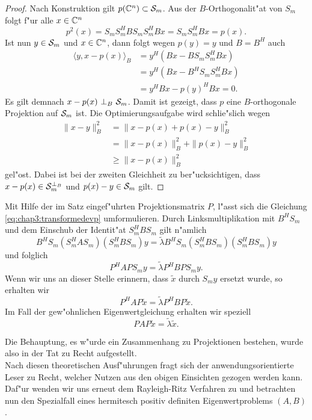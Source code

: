 \begin{proof}
Nach Konstruktion gilt $p(\Cn)\subset \S_m$. Aus der $B$-Orthogonalit"at von $S_m$ folgt f"ur alle $x\in\Cn$
\[
p^2 (x) = S_m S_m^H B S_m S_m^H B x= S_m S_m^H Bx = p(x).
\]
Ist nun $y\in\S_m$ und $x\in\Cn$, dann folgt wegen $p(y) = y$ und $B=B^H$ auch
\begin{align*}
\langle y, x-p(x)\rangle_B &= y^H (Bx - B S_m S_m^H Bx) \\
&= y^H (Bx - B^H S_m S_m^H Bx) \\
&= y^H Bx - p(y)^H Bx = 0.
\end{align*}
Es gilt demnach $x-p(x) \ \bot_B \ \S_m$. Damit ist gezeigt, dass $p$ eine $B$-orthogonale Projektion auf $\S_m$ ist. Die Optimierungsaufgabe wird schlie"slich wegen
\begin{align*}
\|x-y\|_B^2 &= \|x-p(x) + p(x)-y\|_B^2 \\
&= \|x-p(x)\|_B^2 + \|p(x)-y\|_B^2\\
&\ge \|x-p(x)\|_B^2
\end{align*}
gel"ost. Dabei ist bei der zweiten Gleichheit zu ber"ucksichtigen, dass $x-p(x) \in \S_m^{\bot_B}$
und $p(x)-y \in \S_m$ gilt.
\end{proof}

Mit Hilfe der im Satz eingef"uhrten Projektionsmatrix $P$, l"asst sich die Gleichung
\eqref{eq:chap3:transformedevp} umformulieren. Durch Linksmultiplikation
mit $B^H S_m$ und dem Einschub der Identit"at $S_m^H B S_m$ gilt n"amlich
\[
B^H S_m (S_m^H A S_m)(S_m^H B S_m)y = \widetilde{\lambda} B^H S_m (S_m^H B S_m)(S_m^H B S_m)y
\]
und folglich
\[
P^H A P S_m y = \widetilde{\lambda} P^H B P S_m y.
\]
Wenn wir uns an dieser Stelle erinnern, dass $\widetilde{x}$ durch $S_m y$ ersetzt wurde, so
erhalten wir
\[
P^H A P \widetilde{x} = \widetilde{\lambda} P^H B P \widetilde{x}.
\]
Im Fall der gew"ohnlichen Eigenwertgleichung erhalten wir speziell
\[
P A P \widetilde{x} = \widetilde{\lambda} \widetilde{x}.
\]

Die Behauptung, es w"urde ein Zusammenhang zu Projektionen bestehen, wurde also in der Tat zu Recht aufgestellt.\\

Nach diesen theoretischen Ausf"uhrungen fragt sich der anwendungsorientierte Leser zu Recht, welcher Nutzen aus den obigen Einsichten gezogen werden kann.
Daf"ur wenden wir uns erneut dem Rayleigh-Ritz Verfahren zu und betrachten nun den Spezialfall eines hermitesch positiv definiten Eigenwertproblems $(A,B)$.

